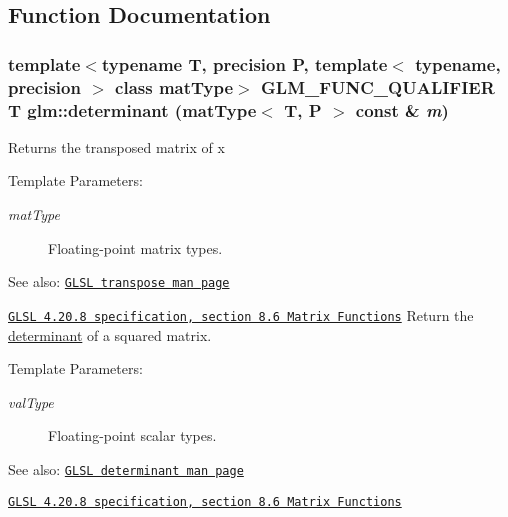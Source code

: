 \subsection{Function Documentation}
\hypertarget{group__core__func__matrix_g704c9bfebc2533c6715691de6473f90b}{
\subsubsection[determinant]{\setlength{\rightskip}{0pt plus 5cm}template$<$typename T, precision P, template$<$ typename, precision $>$ class matType$>$ GLM\_\-FUNC\_\-QUALIFIER T glm::determinant (matType$<$ T, P $>$ const \& {\em m})}}
\label{group__core__func__matrix_g704c9bfebc2533c6715691de6473f90b}


Returns the transposed matrix of x

\begin{Desc}
\item[Template Parameters:]
\begin{description}
\item[{\em matType}]Floating-point matrix types.\end{description}
\end{Desc}
\begin{Desc}
\item[See also:]\href{http://www.opengl.org/sdk/docs/manglsl/xhtml/transpose.xml}{\tt GLSL transpose man page} 

\href{http://www.opengl.org/registry/doc/GLSLangSpec.4.20.8.pdf}{\tt GLSL 4.20.8 specification, section 8.6 Matrix Functions} Return the \hyperlink{group__core__func__matrix_g704c9bfebc2533c6715691de6473f90b}{determinant} of a squared matrix.\end{Desc}
\begin{Desc}
\item[Template Parameters:]
\begin{description}
\item[{\em valType}]Floating-point scalar types.\end{description}
\end{Desc}
\begin{Desc}
\item[See also:]\href{http://www.opengl.org/sdk/docs/manglsl/xhtml/determinant.xml}{\tt GLSL determinant man page} 

\href{http://www.opengl.org/registry/doc/GLSLangSpec.4.20.8.pdf}{\tt GLSL 4.20.8 specification, section 8.6 Matrix Functions} \end{Desc}


